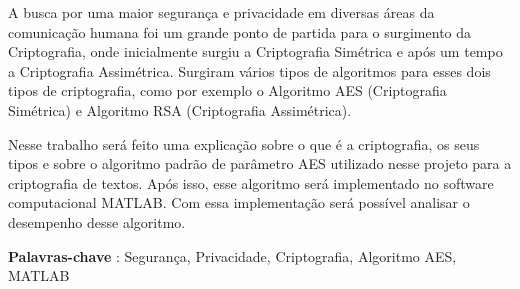 

\setlength{\absparsep}{18pt} %
	\begin{resumo}
	A busca por uma maior segurança e privacidade em diversas áreas da comunicação humana
foi um grande ponto de partida para o surgimento da Criptografia, onde inicialmente surgiu a Criptografia Simétrica e após um tempo
a Criptografia Assimétrica. Surgiram vários tipos de algoritmos para esses dois tipos de criptografia, como por exemplo o Algoritmo AES (Criptografia Simétrica)  e Algoritmo RSA (Criptografia Assimétrica).


Nesse trabalho será feito uma explicação sobre o que é a criptografia, os seus tipos e sobre o algoritmo padrão de parâmetro AES
utilizado nesse projeto para a criptografia de textos. Após isso, esse algoritmo será implementado no software
computacional MATLAB. Com essa implementação será possível analisar o desempenho desse algoritmo.
	
		\noindent
		\textbf{Palavras-chave} : Segurança, Privacidade, Criptografia, Algoritmo AES, MATLAB
	\end{resumo}
